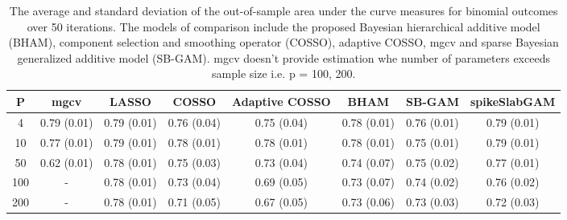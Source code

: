 \begin{table}[ht]
\centering
\begin{tabular}{cccccccc}
  \hline
P & mgcv & LASSO & COSSO & Adaptive COSSO & BHAM & SB-GAM & spikeSlabGAM \\ 
  \hline
  4 & 0.79 (0.01) & 0.79 (0.01) & 0.76 (0.04) & 0.75 (0.04) & 0.78 (0.01) & 0.76 (0.01) & 0.79 (0.01) \\ 
   10 & 0.77 (0.01) & 0.79 (0.01) & 0.78 (0.01) & 0.78 (0.01) & 0.78 (0.01) & 0.75 (0.01) & 0.79 (0.01) \\ 
   50 & 0.62 (0.01) & 0.78 (0.01) & 0.75 (0.03) & 0.73 (0.04) & 0.74 (0.07) & 0.75 (0.02) & 0.77 (0.01) \\ 
  100 & - & 0.78 (0.01) & 0.73 (0.04) & 0.69 (0.05) & 0.73 (0.07) & 0.74 (0.02) & 0.76 (0.02) \\ 
  200 & - & 0.78 (0.01) & 0.71 (0.05) & 0.67 (0.05) & 0.73 (0.06) & 0.73 (0.03) & 0.72 (0.03) \\ 
   \hline
\end{tabular}
\caption{The average and standard deviation of the out-of-sample area under the curve measures
    for binomial outcomes over 50 iterations. The models of comparison include the proposed Bayesian
    hierarchical additive model (BHAM), component selection and smoothing operator (COSSO),
    adaptive COSSO, mgcv and sparse Bayesian generalized additive model (SB-GAM). mgcv doesn't provide
    estimation whe number of parameters exceeds sample size i.e. p = 100, 200.} 
\label{tab:lnr_bin_auc}
\end{table}
